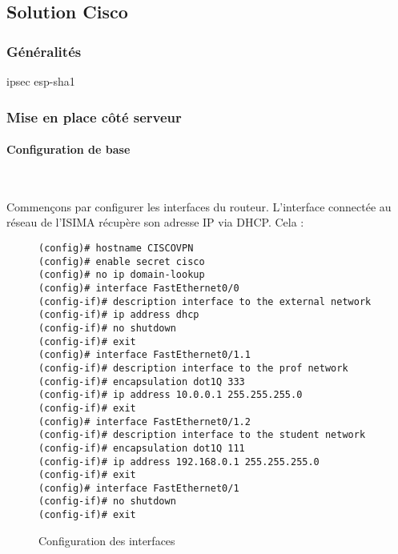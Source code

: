 \subsection{Solution Cisco}

\subsubsection{Généralités}
ipsec esp-sha1

\subsubsection{Mise en place côté serveur}


\paragraph{Configuration de base}
~

Commençons par configurer les interfaces du routeur. L'interface connectée au réseau de l'ISIMA récupère son adresse IP via DHCP. Cela :
\begin{figure}[H]
	\begin{center}
		\begin{minipage}{0.90\textwidth}
			\begin{lstlisting}[frame=trBL]
(config)# hostname CISCOVPN
(config)# enable secret cisco
(config)# no ip domain-lookup
(config)# interface FastEthernet0/0
(config-if)# description interface to the external network
(config-if)# ip address dhcp
(config-if)# no shutdown
(config-if)# exit
(config)# interface FastEthernet0/1.1
(config-if)# description interface to the prof network
(config-if)# encapsulation dot1Q 333
(config-if)# ip address 10.0.0.1 255.255.255.0
(config-if)# exit
(config)# interface FastEthernet0/1.2
(config-if)# description interface to the student network
(config-if)# encapsulation dot1Q 111
(config-if)# ip address 192.168.0.1 255.255.255.0
(config-if)# exit
(config)# interface FastEthernet0/1
(config-if)# no shutdown
(config-if)# exit
			\end{lstlisting}
		\end{minipage}
	\end{center}
	\caption{Configuration des interfaces}
	\label{configuration_interfaces}
\end{figure}

~

